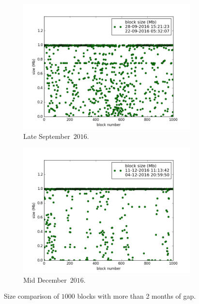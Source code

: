 \documentclass[USenglish]{uit-thesis}
\begin{document}
\begin{figure}[H]
	\centering
	\begin{subfigure}{1\textwidth}
		\centering
		\includegraphics[width=1\linewidth]{img/byte_per_blockA}
		\caption{Late September~$2016$.}
		\label{fig:size_comparisonA}
	\end{subfigure}

	\begin{subfigure}{1\textwidth}
		\centering
		\includegraphics[width=1\linewidth]{img/byte_per_blockB}
		\caption{Mid December~$2016$.}
		\label{fig:size_comparisonB}
	\end{subfigure}
	\caption{Size comparison of $1000$ blocks with more than 2 months of gap.}
	\label{fig:size_comparison}
\end{figure}
\end{document}
